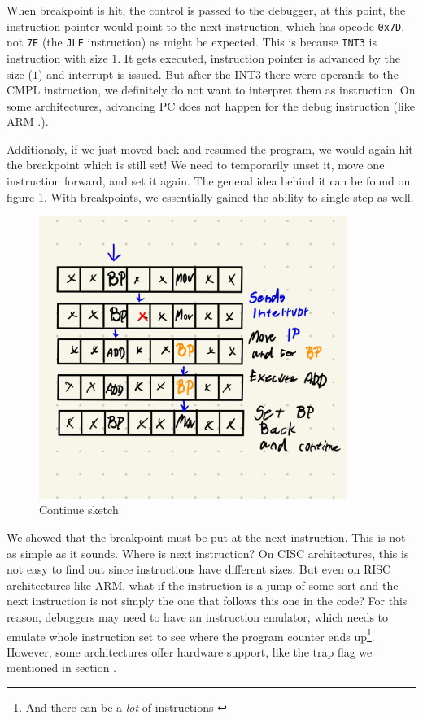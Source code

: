 When breakpoint is hit, the control is passed to the debugger, at this point,
the instruction pointer would point to the next instruction, which has opcode
\texttt{0x7D}, not \texttt{7E} (the \texttt{JLE} instruction) as might be
expected. This is because \texttt{INT3} is instruction with size $1$. It gets
executed, instruction pointer is advanced by the size ($1$) and interrupt is
issued. But after the INT3 there were operands to the CMPL instruction, we
definitely do not want to interpret them as instruction. On some architectures,
advancing PC does not happen for the debug instruction (like ARM .).

Additionaly, if we just moved back and resumed the program, we would again hit
the breakpoint which is still set! We need to temporarily unset it, move one
instruction forward, and set it again. The general idea behind it can be found
on figure \ref{fig:continue}. With breakpoints, we essentially gained the
ability to single step as well. 

\begin{figure}\label{fig:continue}
    \centering
    \includegraphics[width=100mm,scale=0.5]{media/breakpoint_tbd}
    \caption{Continue sketch}
\end{figure}

We showed that the breakpoint must be put
at the next instruction. This is not as simple as it sounds. Where is next
instruction? On CISC architectures, this is not easy to find out since
instructions have different sizes. But even on RISC architectures like ARM,
what if the instruction is a jump of some sort and the next instruction is not
simply the one that follows this one in the code? For this reason, debuggers may
need to have an instruction emulator, which needs to emulate whole instruction
set to see where the program counter ends up\footnote{And there can be a
\textit{lot} of instructions \cite{intel-manual}}. However, some architectures
offer hardware support, like the trap flag we mentioned in section .

